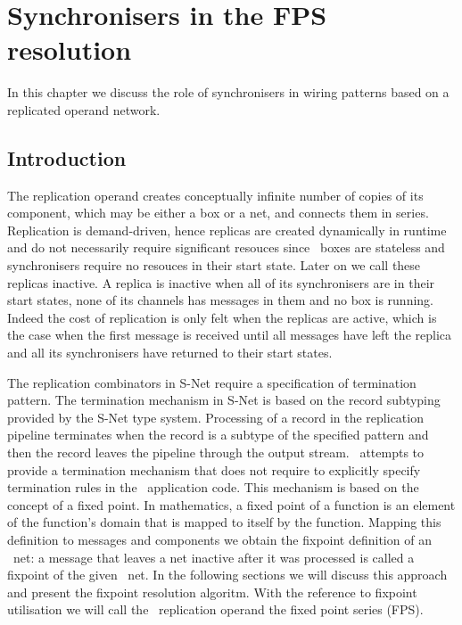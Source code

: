 \chapter{Synchronisers in the FPS resolution}

In this chapter we discuss the role of synchronisers in wiring patterns based on a replicated operand network.


    \section{Introduction}
The replication operand creates conceptually infinite number of copies of its component, which may be either a box or a net, and connects them in series. Replication is demand-driven, hence replicas are created dynamically in runtime and do not necessarily require significant resouces since \ak\ boxes are stateless and synchronisers require no resouces in their start state. Later on we call these replicas inactive. A replica is inactive when all of its synchronisers are in their start states, none of its channels has messages in them and no box is running. Indeed the cost of replication is only felt when the replicas are active, which is the case when the first message is received until all messages have left the replica and all its synchronisers have returned to their start states.

The replication combinators in S-Net require a specification of termination pattern. The termination mechanism in S-Net is based on the record subtyping provided by the S-Net type system. Processing of a record in the replication pipeline terminates when the record is a subtype of the specified pattern and then the record leaves the pipeline through the output stream. \ak\ attempts to provide a termination mechanism that does not require to explicitly specify termination rules in the \ak\ application code. This mechanism is based on the concept of a fixed point. In mathematics, a fixed point of a function is an element of the function's domain that is mapped to itself by the function. Mapping this definition to messages and components we obtain the fixpoint definition of an \ak\ net: a message that leaves a net inactive after it was processed is called a fixpoint of the given \ak\ net. In the following sections we will discuss this approach and present the fixpoint resolution algoritm. With the reference to fixpoint utilisation we will call the \ak\ replication operand the fixed point series (FPS).

